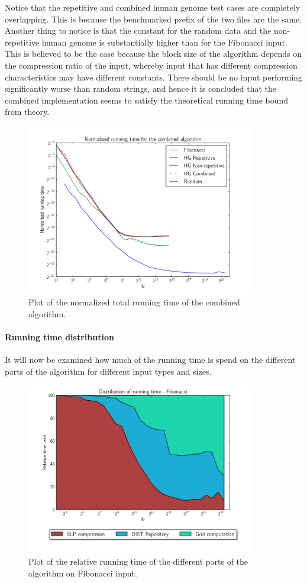 \documentclass[twoside,11pt,openright]{report}
\begin{document}
Notice that the repetitive and combined human genome test cases are completely overlapping. This is because the benchmarked prefix of the two files are the same. Another thing to notice is that the constant for the random data and the non-repetitive human genome is substantially higher than for the Fibonacci input. This is believed to be the case because the block size of the algorithm depends on the compression ratio of the input, whereby input that has different compression characteristics may have different constants. There should be no input performing significantly worse than random strings, and hence it is concluded that the combined implementation seems to satisfy the theoretical running time bound from theory.
\begin{figure}[h!]
  \centering
  \includegraphics[width=10cm]{combined/total_runningtime}
  \caption{Plot of the normalized total running time of the combined algorithm.}
  \label{fig:benchmark:total-time-combined}
\end{figure}

\paragraph{Running time distribution}
It will now be examined how much of the running time is spend on the different parts of the algorithm for different input types and sizes.

\begin{figure}[h!]
  \centering
  \includegraphics[width=10cm]{combined/fib_area_plot}
  \caption{Plot of the relative running time of the different parts of the algorithm on Fibonacci input.}
  \label{fig:benchmark:relative-runningtime-fib}
\end{figure}
\end{document}
